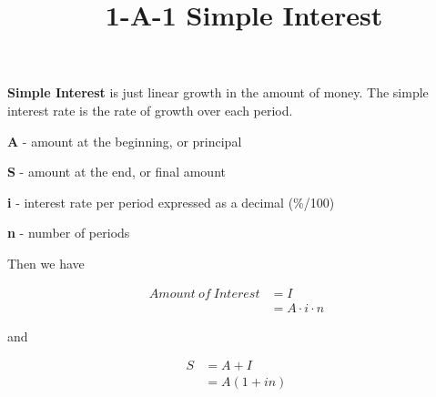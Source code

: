 \documentclass[12pt]{article}
\title{\normalfont\ 1-A-1 Simple Interest} %
\author{} %
\date{}  %
\begin{document}
\maketitle %

\vspace{-25truemm}

\begin{flushleft}
    \textbf{Simple Interest} is just linear growth in the amount of money.
    The simple interest rate is the rate of growth over each period.
\end{flushleft}

\begin{description}
    \item\textbf{A} - amount at the beginning, or principal
    \item\textbf{S} - amount at the end, or final amount
    \item\textbf{i} - interest rate per period expressed as a decimal {(\%/100)}
    \item\textbf{n} - number of periods
\end{description}


\begin{flushleft}
    Then we have
\end{flushleft}

\vspace{-.5in}

\begin{align*}
    Amount \: of \: Interest & = I                 \\
                             & = A \cdot i \cdot n
\end{align*}

\begin{flushleft}
    and
\end{flushleft}

\vspace{-.5in}

\begin{align*}
    S & = A + I     \\
      & = A(1 + in)
\end{align*}
\end{document}
